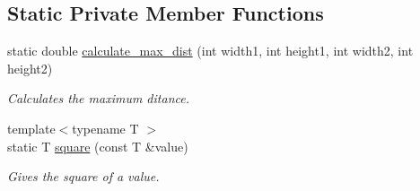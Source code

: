 \subsection*{Static Private Member Functions}
\begin{DoxyCompactItemize}
\item 
\hypertarget{classofeli_1_1_hausdorff_distance_ad6b75e3f7e4bedbd8eb9a280d25d4d21}{static double \hyperlink{classofeli_1_1_hausdorff_distance_ad6b75e3f7e4bedbd8eb9a280d25d4d21}{calculate\-\_\-max\-\_\-dist} (int width1, int height1, int width2, int height2)}\label{classofeli_1_1_hausdorff_distance_ad6b75e3f7e4bedbd8eb9a280d25d4d21}

\begin{DoxyCompactList}\small\item\em Calculates the maximum ditance. \end{DoxyCompactList}\item 
\hypertarget{classofeli_1_1_hausdorff_distance_a96693bddcceb4086bc8da73a0db696d8}{{\footnotesize template$<$typename T $>$ }\\static T \hyperlink{classofeli_1_1_hausdorff_distance_a96693bddcceb4086bc8da73a0db696d8}{square} (const T \&value)}\label{classofeli_1_1_hausdorff_distance_a96693bddcceb4086bc8da73a0db696d8}

\begin{DoxyCompactList}\small\item\em Gives the square of a value. \end{DoxyCompactList}\end{DoxyCompactItemize}
